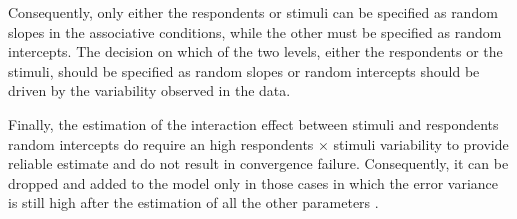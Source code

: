 \documentclass{book}
\begin{document}
Consequently, only either the respondents or stimuli can be specified as random slopes in the associative conditions, while the other must be specified as random intercepts. 
The decision on which of the two levels, either the respondents or the stimuli, should be specified as random slopes or random intercepts should be driven by the variability observed in the data. 

Finally, the estimation of the interaction effect between stimuli and respondents random intercepts do require an high respondents $\times$ stimuli variability to provide reliable estimate and do not result in convergence failure. Consequently, it can be dropped and added to the model only in those cases in which the error variance is still high after the estimation of all the other parameters \cite{Westfall2014}.




\newpage
% 
%
\end{document}
